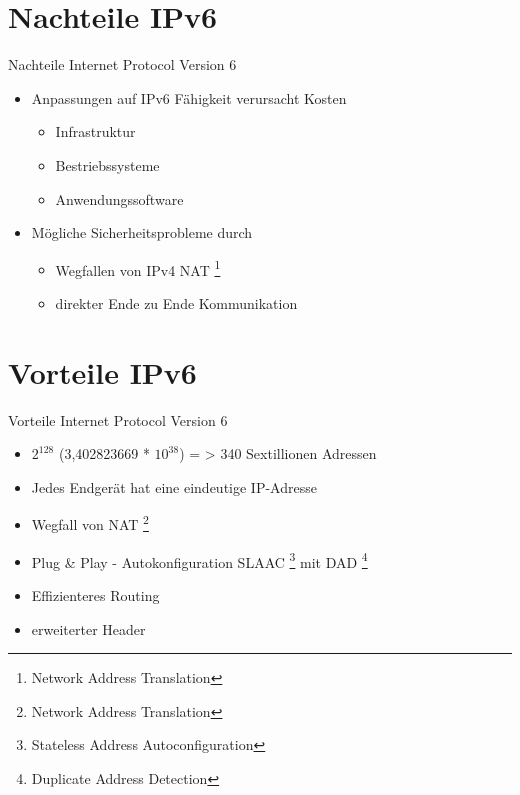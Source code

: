 \documentclass[xcolor=dvipsnames]{beamer}
\begin{document}

\section{Nachteile IPv6}
\begin{frame}
  \begin{alertblock}{Nachteile Internet Protocol Version 6}
	  \begin{itemize}
	  	\item Anpassungen auf IPv6 Fähigkeit verursacht Kosten
	  	\begin{itemize}
		    \item Infrastruktur
		    \item Bestriebssysteme 
		    \item Anwendungssoftware
		\end{itemize}	    
	    \item Mögliche Sicherheitsprobleme durch 
		\begin{itemize}
		     \item Wegfallen von IPv4 NAT \footnote{Network Address Translation} 
		     \item direkter Ende zu Ende Kommunikation
		\end{itemize}
	  \end{itemize}
  \end{alertblock}
\end{frame}

\section{Vorteile IPv6}
\begin{frame}
  \begin{block}{Vorteile Internet Protocol Version 6}
	  \begin{itemize}
  		\item $2^{128}$ (3,402823669 * $10^{38}$) = > 340 Sextillionen Adressen
  		\item Jedes Endgerät hat eine eindeutige IP-Adresse 
  		\item Wegfall von NAT \footnote{Network Address Translation}
  		\item Plug \& Play - Autokonfiguration SLAAC \footnote{Stateless Address Autoconfiguration} mit DAD \footnote{Duplicate Address Detection}
 		\item Effizienteres Routing
 		\item erweiterter Header
	  \end{itemize}
  \end{block}
\end{frame}
\end{document}
